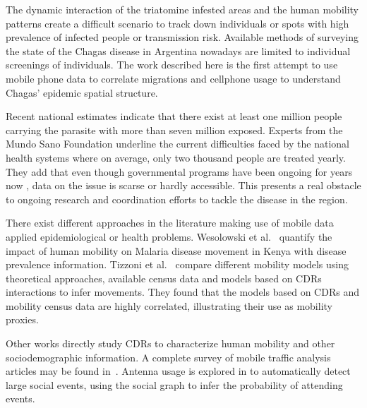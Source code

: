 The dynamic interaction of the triatomine infested areas and the human mobility patterns create a difficult scenario to track down individuals or spots with high prevalence of infected people or transmission risk. Available methods of surveying the state of the Chagas disease in Argentina nowadays are limited to individual screenings of individuals. The work described here is the first attempt to use mobile phone data to correlate migrations and cellphone usage to understand Chagas’ epidemic spatial structure.

Recent national estimates indicate that there exist at least one million people carrying the parasite with more than seven million exposed. Experts from the Mundo Sano Foundation underline the current difficulties faced by the national health systems where on average, only two thousand people are treated yearly. They add that even though governmental programs have been ongoing for years now \cite{plan_nacional_chagas}, data on the issue is scarse or hardly accessible. This presents a real obstacle to ongoing research and coordination efforts to tackle the disease in the region.

There exist different approaches in the literature making use of mobile data applied epidemiological or health problems.
Wesolowski et al.~\cite{wesolowski2012quantifying} quantify the impact of human mobility on Malaria disease movement in Kenya with disease prevalence information.
Tizzoni et al.~\cite{tizzoni2014use} compare different mobility models using theoretical approaches, available census data and models based on CDRs interactions to infer movements. They found that the models based on CDRs and mobility census data are highly correlated, illustrating their use as mobility proxies.

Other works directly study CDRs to characterize human mobility and other
sociodemographic information. A complete survey of mobile traffic analysis articles may be found in~\cite{naboulsi2015mobile}. Antenna usage is explored in \cite{sarraute2015socialevents} to automatically detect large social events, using the social graph to infer the probability of attending events.

